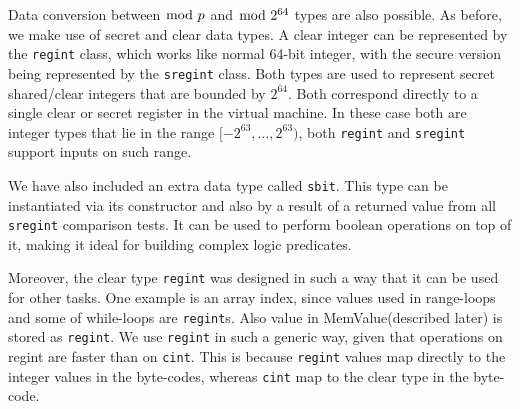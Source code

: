 Data conversion between $\bmod \; p$ and $\bmod \; 2^{64}$ types are also possible. As before, we make use of secret and clear data types. A clear integer can be represented by the \verb|regint| class, which works like normal 64-bit integer,
with the secure version being represented by the \verb|sregint| class.
Both types are used to represent secret shared/clear integers that are bounded by $2^{64}$.
Both correspond directly to a single clear or secret register in the virtual machine.
In these case both are integer types that lie in the range $[-2^{63}, \dots, 2^{63})$, both \verb|regint| and \verb|sregint| support inputs on such  range.

We have also included an extra data type called \verb|sbit|.
This type can be instantiated via its constructor and also
by a result of a returned value from all \verb|sregint| comparison tests.
It can be used to perform boolean operations on top of it, making it ideal for building complex logic predicates.

Moreover, the clear type \verb|regint| was designed in such a way that it can be used for other tasks.
One example is an array index, since values used in range-loops and some of while-loops are \verb|regint|s.
Also value in MemValue(described later) is stored as \verb|regint|.
We use \verb|regint| in such a generic way, given that operations on regint are faster than on \verb|cint|.
This is because \verb+regint+ values map directly to the integer values in the byte-codes,
whereas \verb+cint+ map to the clear type in the byte-code.

